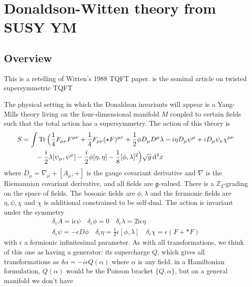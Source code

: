 \chapter{Donaldson-Witten theory from SUSY YM} 
\label{chapter6}

\section{Overview}
This is a retelling of Witten's 1988 TQFT paper. 
\cite{wittenTQFT} is the seminal article on twisted supersymmetric TQFT 

The physical setting in which the Donaldson invariants will appear is a
Yang-Mills theory living on the four-dimensional manifold $M$ coupled to certain
fields such that the total action has a supersymmetry. The action of this theory
is 
\begin{align*}
	S &= \int \Tr \Big(\frac{1}{4}F_{\mu\nu}F^{\mu\nu} +\frac{1}{4}F_{\mu\nu}(\star
F)^{\mu\nu} +\frac{1}{2}\phi D_\mu D^\mu\lambda - i\eta D_\mu\psi^\mu +
iD_\mu\psi_\nu\chi^{\mu\nu} \\ 
	  &\qquad - \frac{i}{2}\lambda[\psi_\mu,\psi^\mu]-\frac{i}{2}\phi[\eta,\eta]-\frac{1}{8}[\phi,\lambda]^2\Big)\sqrt{g} \odif[order=4]{x}
\end{align*}
where $D_\mu = \nabla_\mu + [A_\mu,+]$ is the gauge covariant derivative and
$\nabla$ is the Riemannian covariant derivative, and all fields are
$\mathfrak{g}$-valued. There is a  $\mathbb{Z}_2$-grading on the space of
fields. The bosonic fields are $\phi,\lambda$ and the fermionic fields are
$\eta,\psi,\chi$ and  $\chi$ is additional constrained to be self-dual. The
action is invariant under the symmetry 
\begin{align*}
	\delta_\epsilon A = \mathrm{i}\epsilon\psi \quad \delta_\epsilon\phi = 0
	\quad \delta_\epsilon\lambda = 2\mathrm{i}\epsilon\eta \\
	\delta_\epsilon\psi = -\epsilon D\phi \quad \delta_\epsilon\eta =
	\frac{1}{2}\epsilon[\phi,\lambda] \quad \delta_\epsilon \chi = \epsilon(F +
	\ast F) 
\end{align*}
with $\epsilon$ a fermionic infinitesimal parameter. As with all
transformations, we think of this one as having a generator: its supercharge
$Q$, which gives all transformations as  $\delta \alpha=-i\epsilon Q(\alpha)$
where $\alpha$ is any field. in a Hamiltonian formulation,  $Q(\alpha)$ would be
the Poisson bracket  $\{Q,\alpha\}$, but on a general manifold we don't have
